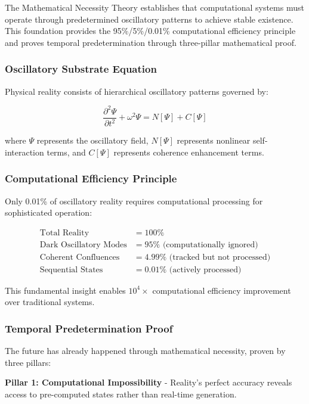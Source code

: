 \documentclass[12pt,a4paper]{article}
\begin{document}
The Mathematical Necessity Theory establishes that computational systems must operate through predetermined oscillatory patterns to achieve stable existence. This foundation provides the 95\%/5\%/0.01\% computational efficiency principle and proves temporal predetermination through three-pillar mathematical proof.

\subsubsection{Oscillatory Substrate Equation}

Physical reality consists of hierarchical oscillatory patterns governed by:

\begin{equation}
\frac{\partial^2\Psi}{\partial t^2} + \omega^2\Psi = N[\Psi] + C[\Psi]
\end{equation}

where $\Psi$ represents the oscillatory field, $N[\Psi]$ represents nonlinear self-interaction terms, and $C[\Psi]$ represents coherence enhancement terms.

\subsubsection{Computational Efficiency Principle}

Only 0.01\% of oscillatory reality requires computational processing for sophisticated operation:

\begin{align}
\text{Total Reality} &= 100\% \\
\text{Dark Oscillatory Modes} &= 95\% \text{ (computationally ignored)} \\
\text{Coherent Confluences} &= 4.99\% \text{ (tracked but not processed)} \\
\text{Sequential States} &= 0.01\% \text{ (actively processed)}
\end{align}

This fundamental insight enables $10^4\times$ computational efficiency improvement over traditional systems.

\subsubsection{Temporal Predetermination Proof}

The future has already happened through mathematical necessity, proven by three pillars:

\textbf{Pillar 1: Computational Impossibility} - Reality's perfect accuracy reveals access to pre-computed states rather than real-time generation.
\end{document}
